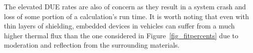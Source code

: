 The elevated DUE rates are also of concern as they result in a system crash and loss of some portion of a calculation's run time. 
It is worth noting that even with thin layers of shielding, embedded devices in vehicles can suffer from a much higher thermal flux than the one considered in Figure~\ref{fig_fitpercents} due to moderation and reflection from the surrounding materials.%


